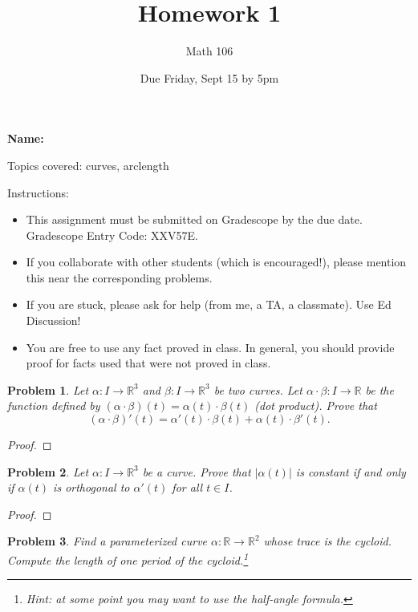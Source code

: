 \documentclass[11pt]{article}
\author{Math 106}
\date{Due Friday, Sept 15 by 5pm}
\title{Homework 1}
\newtheorem{problem}{Problem}
\begin{document}
\maketitle

{\bf\Large Name:} 


\vspace{.3in}
Topics covered: curves, arclength

Instructions: 
\begin{itemize}
\item This assignment must be submitted on Gradescope by the due date. Gradescope Entry Code: XXV57E. 
\item If you collaborate with other students (which is encouraged!), please mention this near the corresponding problems. 
\item If you are stuck, please ask for help (from me, a TA, a classmate). Use Ed Discussion!  
\item You are free to use any fact proved in class. In general, you should provide proof for facts used that were not proved in class. 
\end{itemize}
\pagebreak 


\begin{problem}
Let $\alpha:I\to\mathbb R^3$ and $\beta:I\to\mathbb R^3$ be two curves. Let $\alpha\cdot\beta:I\to\mathbb R$ be the function defined by $(\alpha\cdot\beta)(t)=\alpha(t)\cdot\beta(t)$ (dot product). Prove that 
\[(\alpha\cdot\beta)'(t)=\alpha'(t)\cdot\beta(t)+\alpha(t)\cdot\beta'(t).\]
\end{problem}

\begin{proof}

\end{proof}

\pagebreak

\begin{problem}
Let $\alpha:I\to\mathbb R^3$ be a curve. Prove that $|\alpha(t)|$ is constant if and only if $\alpha(t)$ is orthogonal to $\alpha'(t)$ for all $t\in I$. 
\end{problem}

\begin{proof}

\end{proof} 

\pagebreak

\begin{problem}
Find a parameterized curve $\alpha:\mathbb R\to\mathbb R^2$ whose trace is the cycloid. Compute the length of one period of the cycloid.\footnote{Hint: at some point you may want to use the half-angle formula.}
\end{problem}
\end{document}
